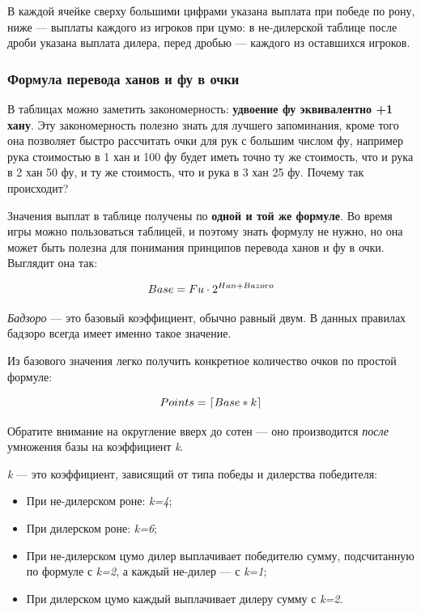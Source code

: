 В каждой ячейке сверху большими цифрами указана выплата при победе по рону, ниже --- выплаты каждого из игроков при цумо: в не-дилерской таблице после дроби указана выплата дилера, перед дробью --- каждого из оставшихся игроков.

\subsubsection{Формула перевода ханов и фу в очки}


В таблицах можно заметить закономерность: \textbf{удвоение фу эквивалентно +1 хану}. Эту закономерность полезно знать для лучшего запоминания, кроме того она позволяет быстро рассчитать очки для рук с большим числом фу, например рука стоимостью в 1 хан и 100 фу будет иметь точно ту же стоимость, что и рука в 2 хан 50 фу, и ту же стоимость, что и рука в 3 хан 25 фу. Почему так происходит? 

Значения выплат в таблице получены по \textbf{одной и той же формуле}. Во время игры можно пользоваться таблицей, и поэтому знать формулу не нужно, но она может быть полезна для понимания принципов перевода ханов и фу в очки. Выглядит она так:

\begin{equation}
	\large
	Base = Fu \cdot 2 ^ {Han + Bazoro}
\end{equation}

\textit{Бадзоро} --- это базовый коэффициент, обычно равный двум. В данных правилах бадзоро всегда имеет именно такое значение.

Из базового значения легко получить конкретное количество очков по простой формуле:

\begin{equation}
	\large
	Points = \lceil Base * k \rceil
\end{equation}

Обратите внимание на округление вверх до сотен --- оно производится \textit{после} умножения базы на коэффициент \textit{k}. 

\textit{k} --- это коэффициент, зависящий от типа победы и дилерства победителя:
\begin{itemize}
	\item При не-дилерском роне: \textit{k=4};
	\item При дилерском роне: \textit{k=6};
	\item При не-дилерском цумо дилер выплачивает победителю сумму, подсчитанную по формуле с \textit{k=2}, а каждый не-дилер --- с \textit{k=1};
	\item При дилерском цумо каждый выплачивает дилеру сумму с \textit{k=2}.
\end{itemize}

